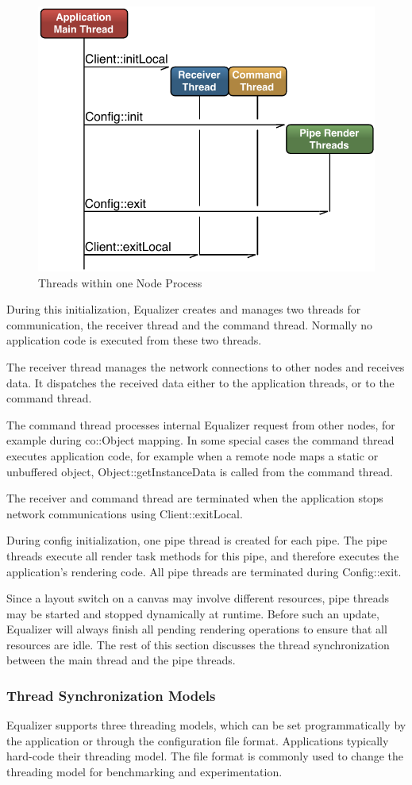 \documentclass[10pt,a4]{scrartcl}
\begin{document}
\begin{figure}
  \includegraphics[width=.618\textwidth]{images/threads.pdf}
  {\caption{\label{fThreads}Threads within one Node Process}}
\end{figure}
During this initialization, Equalizer creates and manages two threads
for communication, the receiver thread and the command thread. Normally
no application code is executed from these two threads.

The receiver thread manages the network connections to other nodes and
receives data. It dispatches the received data either to the application
threads, or to the command thread.

The command thread processes internal Equalizer request from other
nodes, for example during \textsf{co::Object} mapping. In some
special cases the command thread executes application code, for example
when a remote node maps a static or unbuffered object,
\textsf{Object::getInstanceData} is called from the command thread.

The receiver and command thread are terminated when the application
stops network communications using \textsf{Client::exitLocal}.

During config initialization, one pipe thread is created for each pipe. The pipe
threads execute all render task methods for this pipe, and therefore executes
the application's rendering code. All pipe threads are terminated during
\textsf{Config::exit}.

Since a layout switch on a canvas may involve different resources, pipe threads
may be started and stopped dynamically at runtime. Before such an update,
Equalizer will always finish all pending rendering operations to ensure that all
resources are idle. The rest of this section discusses the thread
synchronization between the main thread and the pipe threads.


\subsubsection{\label{sThreadModel}Thread Synchronization Models}
Equalizer supports three threading models, which can be set
programmatically by the application or through the configuration file
format. Applications typically hard-code their threading model. The file
format is commonly used to change the threading model for benchmarking
and experimentation.
\end{document}
